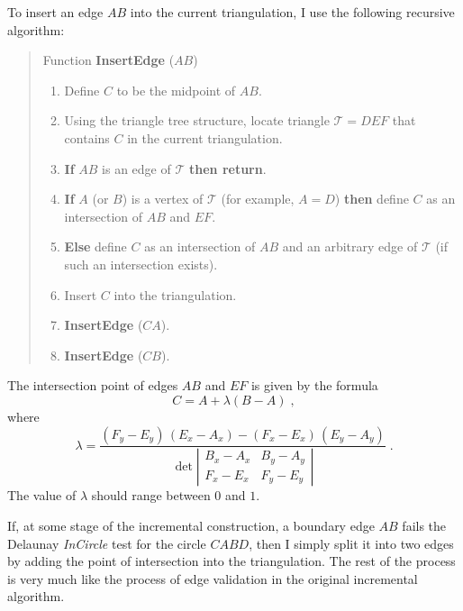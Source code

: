 \par
To insert an edge $AB$ into the current triangulation, I use the
following recursive algorithm:
 \begin{quote}
 Function \textbf{InsertEdge} ($AB$)
 \begin{enumerate}
 \item Define $C$ to be the midpoint of $AB$.
 \item Using the triangle tree structure, locate triangle $\mathcal{T} = DEF$
   that contains $C$ in the current triangulation.
 \item \textbf{If} $AB$ is an edge of $\mathcal{T}$ \textbf{then return}.
 \item \textbf{If} $A$ (or $B$) is a vertex of $\mathcal{T}$ (for example, $A = D$)
   {\bf then} define $C$ as an intersection of $AB$ and $EF$.
 \item {\bf Else} define $C$ as an intersection of $AB$ and an
   arbitrary edge of $\mathcal{T}$ (if such an intersection exists).
 \item Insert $C$ into the triangulation.
 \item {\bf InsertEdge} ($CA$).
 \item {\bf InsertEdge} ($CB$).
 \end{enumerate}
 \end{quote}
\par
The intersection point  of edges $AB$ and $EF$ is given by the formula
\begin{equation}
  C = A + \lambda (B-A)\;,
\end{equation}
where
\begin{equation}
  \lambda = \frac{(F_y - E_y)\,(E_x - A_x) - (F_x - E_x)\,(E_y-A_y)}{
    \det \left|\begin{array}{cc}
        B_x - A_x & B_y - A_y \\
        F_x - E_x & F_y - E_y
    \end{array}\right|}\;.
\end{equation}
The value of $\lambda$ should range between $0$ and $1$.
\par
If, at some stage of the incremental construction, a boundary edge
$AB$ fails the Delaunay \emph{InCircle} test for the circle $CABD$,
then I simply split it into two edges by adding the point of
intersection into the triangulation.  The rest of the process is very
much like the process of edge validation in the original incremental
algorithm.

